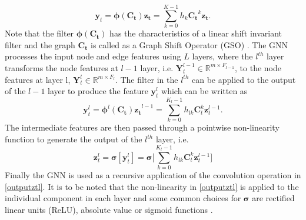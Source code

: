 \documentclass[lettersize,journal]{IEEEtran}
\begin{document}
\begin{equation} \label{outputy}
    \mathbf{y}_t = \mathbf{\phi(C_t)z_t} = \sum_{k=0}^{K-1}h_k \mathbf{C_t}^k \mathbf{z_t}.
\end{equation}
Note that the filter $\mathbf{\phi(C_t)}$ has the characteristics of a linear shift invariant filter and the graph $\mathbf{C_t}$ is called as a Graph Shift Operator (GSO) \cite{sandryhaila2014big}.
The GNN processes the input node and edge features using $L$ layers, where the $l^{th}$ layer transforms the node features at $l-1$ layer, i.e. $\mathbf{Y}_t^{l-1} \in \mathbb{R}^{m \times F_{l-1}}$, to the node features at layer l, $\mathbf{Y}_t^l \in \mathbb{R}^{m \times F_l}$. The filter in the $l^{th}$ can be applied to the output of the $l-1$ layer to produce the feature $\mathbf{y}_t^{l}$ which can be written as
\begin{equation} \label{outputyl}
    \mathbf{y}_t^l = \mathbf{\phi}^l\mathbf{(C_t)z_t}^{l-1} = \sum_{k=0}^{K_l-1}h_{lk} \mathbf{C}_t^k \mathbf{z}_t^{l-1}.
\end{equation}
The intermediate features are then passed through a pointwise non-linearity function to generate the output of the $l^{th}$ layer, i.e.
\begin{equation} \label{outputztl}
    \mathbf{z}_t^l = \mathbf{\sigma}[\mathbf{y}_t^l] = \mathbf{\sigma} \Bigg[ \sum_{k=0}^{K_l-1}h_{lk} \mathbf{C}_t^k \mathbf{z}_t^{l-1} \Bigg]
\end{equation}
Finally the GNN is used as a recursive application of the convolution operation in \eqref{outputztl}. It is to be noted that the non-linearity in \eqref{outputztl} is applied to the individual component in each layer and some common choices for $\mathbf{\sigma}$ are rectified linear units (ReLU), absolute value or sigmoid functions \cite{gama2018convolutional, henaff2015deep}. 
\end{document}
